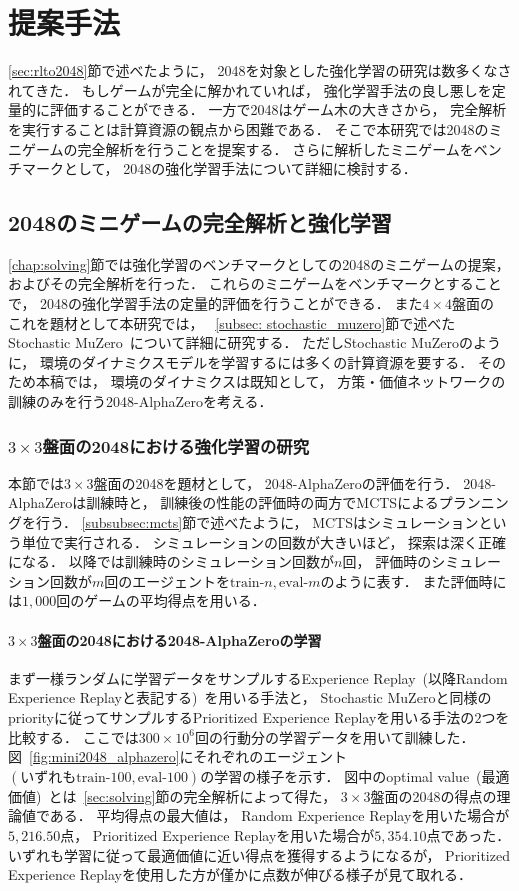 \chapter{提案手法}
\label{chap:proposal}
\ref{sec:rlto2048}節で述べたように， 2048を対象とした強化学習の研究は数多くなされてきた．
もしゲームが完全に解かれていれば， 強化学習手法の良し悪しを定量的に評価することができる．
一方で2048はゲーム木の大きさから， 完全解析を実行することは計算資源の観点から困難である．
そこで本研究では2048のミニゲームの完全解析を行うことを提案する．
さらに解析したミニゲームをベンチマークとして， 2048の強化学習手法について詳細に検討する．



\section{2048のミニゲームの完全解析と強化学習}
\ref{chap:solving}節では強化学習のベンチマークとしての2048のミニゲームの提案， およびその完全解析を行った．
これらのミニゲームをベンチマークとすることで， 2048の強化学習手法の定量的評価を行うことができる．
また$4\times4$盤面の
これを題材として本研究では， ~\ref{subsec: stochastic_muzero}節で述べたStochastic MuZero~\cite{StochasticMuZero}について詳細に研究する．
ただしStochastic MuZeroのように， 環境のダイナミクスモデルを学習するには多くの計算資源を要する．
そのため本稿では， 環境のダイナミクスは既知として， 方策・価値ネットワークの訓練のみを行う2048-AlphaZeroを考える．

\subsection{$3\times3$盤面の2048における強化学習の研究}
本節では$3\times3$盤面の2048を題材として， 2048-AlphaZeroの評価を行う．
2048-AlphaZeroは訓練時と， 訓練後の性能の評価時の両方でMCTSによるプランニングを行う．
\ref{subsubsec:mcts}節で述べたように， MCTSはシミュレーションという単位で実行される．
シミュレーションの回数が大きいほど， 探索は深く正確になる．
以降では訓練時のシミュレーション回数が$n$回， 評価時のシミュレーション回数が$m$回のエージェントを$\text{train-}n,\text{eval-}m$のように表す．
また評価時には$1,000$回のゲームの平均得点を用いる．

\subsubsection{$3\times3$盤面の2048における2048-AlphaZeroの学習}
まず一様ランダムに学習データをサンプルするExperience Replay~(以降Random Experience Replayと表記する)~を用いる手法と， Stochastic MuZeroと同様のpriorityに従ってサンプルするPrioritized Experience Replayを用いる手法の$2$つを比較する．
ここでは$300\times{10}^6$回の行動分の学習データを用いて訓練した．
図~\ref{fig:mini2048_alphazero}にそれぞれのエージェント$(\text{いずれもtrain-}100,\text{eval-}100)$の学習の様子を示す．
図中のoptimal value~(最適価値)~とは~\ref{sec:solving}節の完全解析によって得た， $3\times3$盤面の2048の得点の理論値である．
平均得点の最大値は， Random Experience Replayを用いた場合が$5,216.50$点， Prioritized Experience Replayを用いた場合が$5,354.10$点であった．
いずれも学習に従って最適価値に近い得点を獲得するようになるが， Prioritized Experience Replayを使用した方が僅かに点数が伸びる様子が見て取れる．

